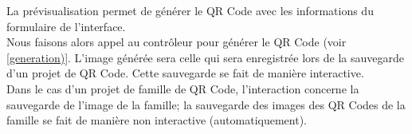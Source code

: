 \par
La prévisualisation permet de générer le QR Code avec les informations du formulaire de l'interface.\\
Nous faisons alors appel au contrôleur pour générer le QR Code (voir \ref{generation)}.
L'image générée sera celle qui sera enregistrée lors de la sauvegarde d'un projet de QR Code. Cette sauvegarde se fait de manière interactive.\\
Dans le cas d'un projet de famille de QR Code, l'interaction concerne la sauvegarde de l'image de la famille; la sauvegarde des images des QR Codes de la famille se fait de manière non interactive (automatiquement).
